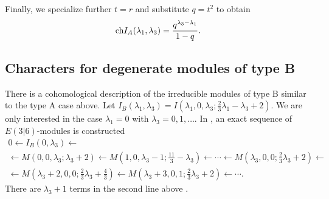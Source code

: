 Finally, we specialize further $t=r$ and substitute $q = t^2$ to obtain
\[
{\rm ch} I_A(\lambda_1,\lambda_3) = \frac{q^{\lambda_3 - \lambda_1}}{1-q} .
\]

\subsection{Characters for degenerate modules of type B} \label{s:typeB}

There is a cohomological description of the irreducible modules of type B similar to the type A case above.
Let $I_B(\lambda_1,\lambda_3) = I(\lambda_1,0,\lambda_3;\frac23 \lambda_1 - \lambda_3+2)$. 
We are only interested in the case $\lambda_1 = 0$ with $\lambda_3=0,1,\ldots$.  
In \cite{KR2}, an exact sequence of $E(3|6)$-modules is constructed
\begin{multline}\label{eqn:les1}
0 \leftarrow  I_B(0,\lambda_3) \leftarrow \\ \leftarrow M(0,0,\lambda_3;\lambda_3 + 2) \leftarrow  M(1,0,\lambda_3-1;\frac{11}{3} - \lambda_3)  \leftarrow \cdots \leftarrow M(\lambda_3, 0, 0;\frac23 \lambda_3 +2) \leftarrow \\
 \leftarrow M(\lambda_3+2, 0, 0; \frac23 \lambda_3 + \frac43) \leftarrow M(\lambda_3+3, 0, 1; \frac23 \lambda_3 + 2) \leftarrow \cdots .
\end{multline}
There are $\lambda_3+1$ terms in the second line above .  


\parsec[s:typeBunrefinedKR]


%
